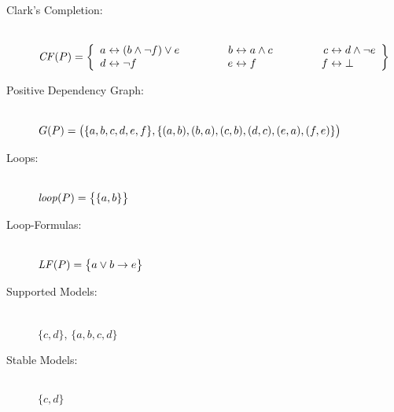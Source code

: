 \begin{Loesung}
\begin{UList}
\begin{description}
%
\item[Clark's Completion:] ~\\
\(
  \Comp{\Pi}
  = 
  \left\{
  \begin{array}{r@{}c@{}l@{\hspace{15.5mm}}r@{}c@{}l@{\hspace{15.7mm}}r@{}c@{}l}
    a & {} \leftrightarrow {} & (b\wedge\neg f)\vee e &
    b & {} \leftrightarrow {} & a\wedge c              &   
    c & {} \leftrightarrow {} & d\wedge\neg e 
    \\
    d & {} \leftrightarrow {} & \neg f &
    e & {} \leftrightarrow {} & f      &
    f & {} \leftrightarrow {} & \bot
  \end{array}
  \right\}
\)
%
\item[Positive Dependency Graph:] ~\\
$G(P)=\big(\{a,b,c,d,e,f\},\{(a,b),(b,a),(c,b),(d,c),(e,a),(f,e)\}\big)$
%
\item[Loops:] ~\\
$\mathit{loop}(P)=\big\{\{a,b\}\big\}$
%
\item[Loop-Formulas:] ~\\
$\mathit{LF}(P)=\big\{a\vee b\rightarrow e\big\}$
%
\item[Supported Models:] ~\\
$\{c,d\}$, $\{a,b,c,d\}$
%
\item[Stable Models:] ~\\
$\{c,d\}$
%
\end{description}
%
\item
\begin{description}

\end{description}
\end{UList}
\end{Loesung}
